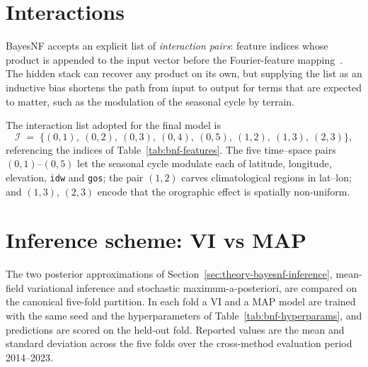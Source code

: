 \section{Interactions}
\label{sec:bayesnf-interactions}

BayesNF accepts an explicit list of \emph{interaction pairs}: feature
indices whose product is appended to the input vector before the
Fourier-feature mapping~\cite{bayesnfRepo}. The hidden stack can
recover any product on its own, but supplying the list as an inductive
bias shortens the path from input to output for terms that are
expected to matter, such as the modulation of the seasonal cycle by
terrain.

The interaction list adopted for the final model is
\begin{equation}
  \mathcal{I} \;=\; \bigl\{
      (0,1),\ (0,2),\ (0,3),\ (0,4),\ (0,5),\ (1,2),\ (1,3),\ (2,3)
  \bigr\},
  \label{eq:bnf-interactions}
\end{equation}
referencing the indices of Table~\ref{tab:bnf-features}. The five
time--space pairs $(0,1)$--$(0,5)$ let the seasonal cycle modulate
each of latitude, longitude, elevation, \texttt{idw} and \texttt{gos};
the pair $(1,2)$ carves climatological regions in lat--lon; and
$(1,3)$, $(2,3)$ encode that the orographic effect is spatially
non-uniform.

\section{Inference scheme: VI vs MAP}
\label{sec:bayesnf-vi-vs-map}

The two posterior approximations of
Section~\ref{sec:theory-bayesnf-inference}, mean-field variational
inference and stochastic maximum-a-posteriori, are compared on the
canonical five-fold partition. In each fold a VI and a MAP model are
trained with the same seed and the hyperparameters of
Table~\ref{tab:bnf-hyperparams}, and predictions are scored on the
held-out fold. Reported values are the mean and standard deviation
across the five folds over the cross-method evaluation period
2014--2023.

